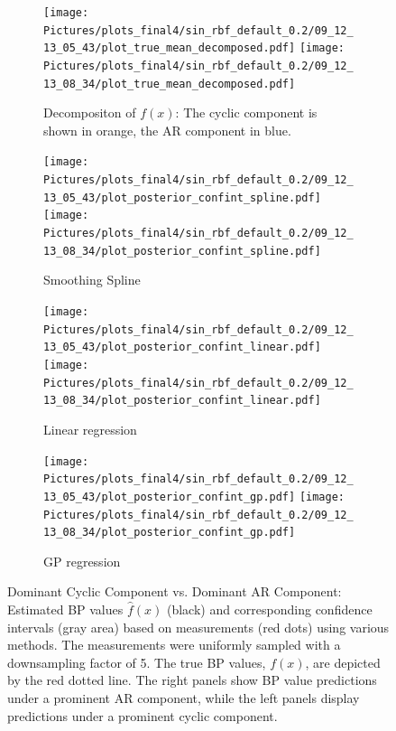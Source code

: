 \begin{figure}
\begin{subfigure}{\textwidth}
    \centering
    \texttt{[image: 
        Pictures/plots\_final4/sin\_rbf\_default\_0.2/09\_12\_13\_05\_43/plot\_true\_mean\_decomposed.pdf]}
    \texttt{[image: 
        Pictures/plots\_final4/sin\_rbf\_default\_0.2/09\_12\_13\_08\_34/plot\_true\_mean\_decomposed.pdf]}
  \caption{Decompositon of $f(x)$: The cyclic component is shown in orange, the AR component in blue.}
\end{subfigure}

\begin{subfigure}{\textwidth}
    \centering
    \texttt{[image: 
        Pictures/plots\_final4/sin\_rbf\_default\_0.2/09\_12\_13\_05\_43/plot\_posterior\_confint\_spline.pdf]}
    \texttt{[image: 
        Pictures/plots\_final4/sin\_rbf\_default\_0.2/09\_12\_13\_08\_34/plot\_posterior\_confint\_spline.pdf]}
  \caption{Smoothing Spline}
\end{subfigure}

\begin{subfigure}{\textwidth}
    \centering
    \texttt{[image: 
        Pictures/plots\_final4/sin\_rbf\_default\_0.2/09\_12\_13\_05\_43/plot\_posterior\_confint\_linear.pdf]}
    \texttt{[image: 
        Pictures/plots\_final4/sin\_rbf\_default\_0.2/09\_12\_13\_08\_34/plot\_posterior\_confint\_linear.pdf]}
  \caption{Linear regression }
\end{subfigure}

\begin{subfigure}{\textwidth}
    \centering
    \texttt{[image: 
        Pictures/plots\_final4/sin\_rbf\_default\_0.2/09\_12\_13\_05\_43/plot\_posterior\_confint\_gp.pdf]}
    \texttt{[image: 
        Pictures/plots\_final4/sin\_rbf\_default\_0.2/09\_12\_13\_08\_34/plot\_posterior\_confint\_gp.pdf]}
  \caption{GP regression}
\end{subfigure}\hfill

\caption[Dominant Cyclic Component vs. Dominant AR Component]{
Dominant Cyclic Component vs. Dominant AR Component:
    Estimated BP values $\hat{f}(x)$ (black) and corresponding confidence intervals (gray area)
    based on measurements (red dots) using various methods.
    The measurements were uniformly sampled with a downsampling factor of 5.
    The true BP values, $f(x)$, are depicted by the red dotted line.
    The right panels show BP value predictions under a prominent AR component,
    while the left panels display predictions under a prominent cyclic component.
 }
\label{fig:ex-ar-cyclic}
\end{figure}



